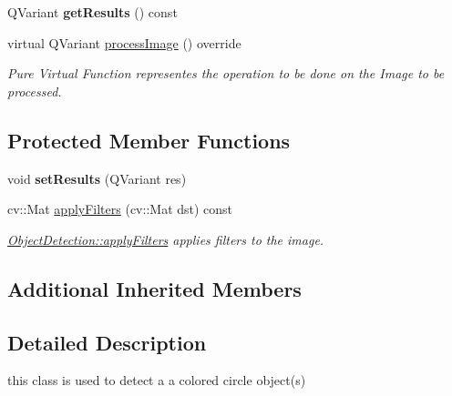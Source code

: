 \begin{DoxyCompactItemize}
\mbox{\label{class_image_processor_1_1_object_detection_af4cd20926a8acb22a005e0a76104461e}} 
Q\+Variant {\bfseries get\+Results} () const
\item 
virtual Q\+Variant \hyperlink{class_image_processor_1_1_object_detection_ac5561650d95eac1672e2d049ed36201d}{process\+Image} () override
\begin{DoxyCompactList}\small\item\em Pure Virtual Function representes the operation to be done on the Image to be processed. \end{DoxyCompactList}\end{DoxyCompactItemize}
\subsection*{Protected Member Functions}
\begin{DoxyCompactItemize}
\item 
\mbox{\label{class_image_processor_1_1_object_detection_afc4689978c5643c90de7feab7ad9d6b9}} 
void {\bfseries set\+Results} (Q\+Variant res)
\item 
cv\+::\+Mat \hyperlink{class_image_processor_1_1_object_detection_a8879a8d088a9a7cd4aa97ac967531feb}{apply\+Filters} (cv\+::\+Mat dst) const
\begin{DoxyCompactList}\small\item\em \hyperlink{class_image_processor_1_1_object_detection_a8879a8d088a9a7cd4aa97ac967531feb}{Object\+Detection\+::apply\+Filters} applies filters to the image. \end{DoxyCompactList}\end{DoxyCompactItemize}
\subsection*{Additional Inherited Members}


\subsection{Detailed Description}
this class is used to detect a a colored circle object(s) 

